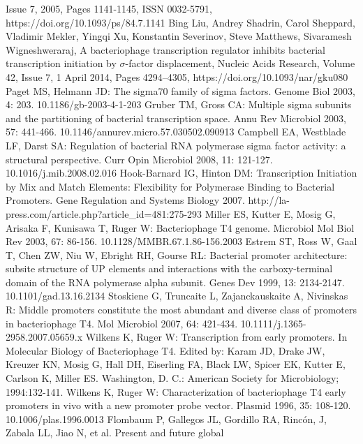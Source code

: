 \documentclass[14pt]{extarticle}
\begin{document}
\begin{thebibliography}{9}
    Issue 7, 2005, Pages 1141-1145, ISSN 0032-5791, https://doi.org/10.1093/ps/84.7.1141
     Bing Liu, Andrey Shadrin, Carol Sheppard, Vladimir Mekler, Yingqi Xu, Konstantin Severinov, 
    Steve Matthews, Sivaramesh Wigneshweraraj, A bacteriophage transcription regulator inhibits bacterial transcription 
    initiation by $\sigma$-factor displacement, Nucleic Acids Research, Volume 42, Issue 7, 1 April 2014, Pages 
    4294–4305, 
    https://doi.org/10.1093/nar/gku080 
     Paget MS, Helmann JD: The sigma70 family of sigma factors. Genome Biol 2003, 4: 203. 
    10.1186/gb-2003-4-1-203
     Gruber TM, Gross CA: Multiple sigma subunits and the partitioning of bacterial transcription space. 
    Annu Rev Microbiol 2003, 57: 441-466. 10.1146/annurev.micro.57.030502.090913
      Campbell EA, Westblade LF, Darst SA: Regulation of bacterial RNA polymerase sigma factor activity: a 
    structural perspective. Curr Opin Microbiol 2008, 11: 121-127. 10.1016/j.mib.2008.02.016
     Hook-Barnard IG, Hinton DM: Transcription Initiation by Mix and Match Elements: Flexibility for 
    Polymerase Binding to Bacterial Promoters. Gene Regulation and Systems Biology 2007. 
    http://la-press.com/article.php?article\_id=481:275-293
     Miller ES, Kutter E, Mosig G, Arisaka F, Kunisawa T, Ruger W: Bacteriophage T4 genome. Microbiol Mol 
    Biol Rev 2003, 67: 86-156. 10.1128/MMBR.67.1.86-156.2003
     Estrem ST, Ross W, Gaal T, Chen ZW, Niu W, Ebright RH, Gourse RL: Bacterial promoter architecture: 
    subsite structure of UP elements and interactions with the carboxy-terminal domain of the RNA polymerase alpha 
    subunit. Genes Dev 1999, 13: 2134-2147. 10.1101/gad.13.16.2134
     Stoskiene G, Truncaite L, Zajanckauskaite A, Nivinskas R: Middle promoters constitute the most abundant
    and diverse class of promoters in bacteriophage T4. Mol Microbiol 2007, 64: 421-434. 
    10.1111/j.1365-2958.2007.05659.x
     Wilkens K, Ruger W: Transcription from early promoters. In Molecular Biology of Bacteriophage T4. Edited
    by: Karam JD, Drake JW, Kreuzer KN, Mosig G, Hall DH, Eiserling FA, Black LW, Spicer EK, Kutter E, Carlson K, Miller
    ES. Washington, D. C.: American Society for Microbiology; 1994:132-141.
     Wilkens K, Ruger W: Characterization of bacteriophage T4 early promoters in vivo with a new promoter 
    probe vector. Plasmid 1996, 35: 108-120. 10.1006/plas.1996.0013
     Flombaum P, Gallegos JL, Gordillo RA, Rincón, J, Zabala LL, Jiao N, et al. Present and future global 

\end{thebibliography}
\end{document}
